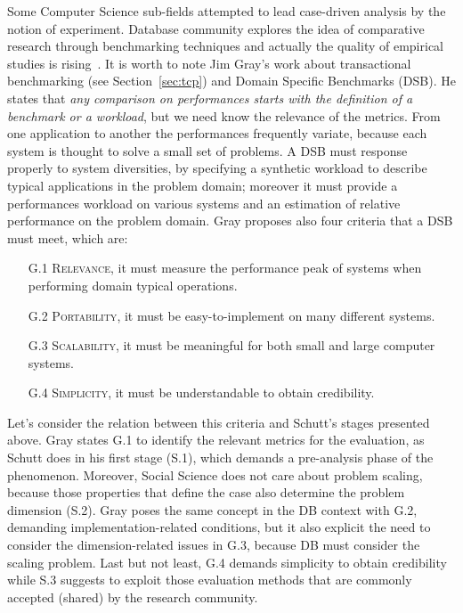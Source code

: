 Some Computer Science sub-fields attempted to lead case-driven analysis by the notion of experiment. Database community explores the idea of comparative research through benchmarking techniques and actually the quality of empirical studies is rising~\cite{Wainer:2009:EEC:1518331.1518552}. It is worth to note Jim Gray's work about transactional benchmarking (see Section~\ref{sec:tcp}) and Domain Specific Benchmarks (DSB). He states that \textit{any comparison on performances starts with the definition of a benchmark or a workload}, but we need know the relevance of the metrics. From one application to another the performances frequently variate, because each system is thought to solve a small set of problems. A DSB must response properly to system diversities, by specifying a synthetic workload to describe typical applications in the problem domain; moreover it must provide a performances workload on various systems and an estimation of relative performance on the problem domain.
Gray proposes also four criteria that a DSB must meet, which are:
\begin{enumerate}
\item[G.1] \textsc{Relevance}, it must measure the performance peak of systems when performing domain typical operations.
\item[G.2] \textsc{Portability}, it must be easy-to-implement on many different systems.
\item[G.3] \textsc{Scalability}, it must be meaningful for both small and large computer systems.
\item[G.4] \textsc{Simplicity}, it must be understandable to obtain credibility.
\end{enumerate} 

Let's consider the relation between this criteria and Schutt's stages presented above. Gray states G.1 to identify the relevant metrics for the evaluation, as Schutt does in his first stage (S.1), which demands a pre-analysis phase of the phenomenon. Moreover, Social Science does not care about problem scaling, because those properties that define the case also determine the problem dimension (S.2). Gray poses the same concept in the DB context with G.2, demanding implementation-related conditions, but it also explicit the need to consider the dimension-related issues in G.3, because DB must consider the scaling problem. Last but not least, G.4 demands simplicity to obtain credibility while S.3 suggests to exploit those evaluation methods that are commonly accepted (shared) by the research community. 

